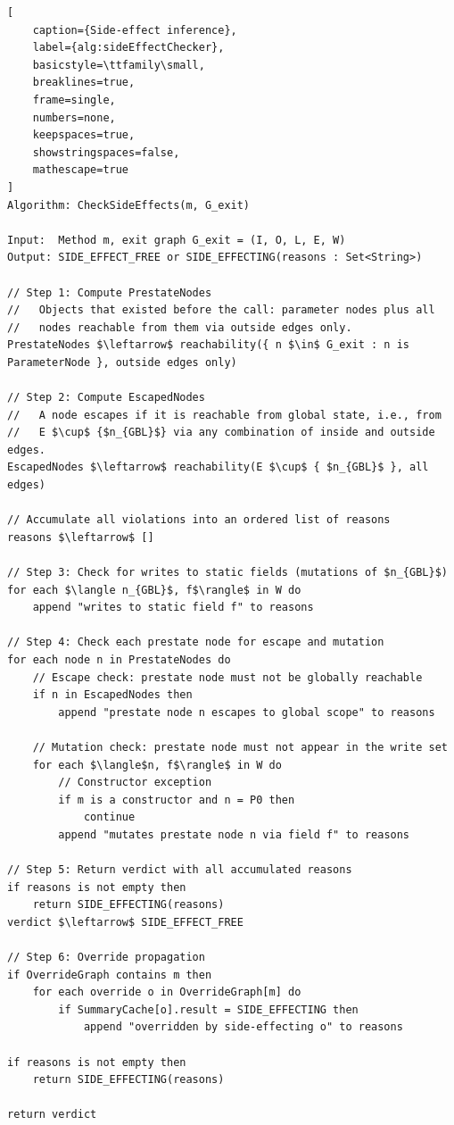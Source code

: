 \begin{lstlisting}[
    caption={Side-effect inference},
    label={alg:sideEffectChecker},
    basicstyle=\ttfamily\small,
    breaklines=true,
    frame=single,
    numbers=none,
    keepspaces=true,
    showstringspaces=false,
    mathescape=true
]
Algorithm: CheckSideEffects(m, G_exit)

Input:  Method m, exit graph G_exit = (I, O, L, E, W)
Output: SIDE_EFFECT_FREE or SIDE_EFFECTING(reasons : Set<String>)

// Step 1: Compute PrestateNodes
//   Objects that existed before the call: parameter nodes plus all
//   nodes reachable from them via outside edges only.
PrestateNodes $\leftarrow$ reachability({ n $\in$ G_exit : n is ParameterNode }, outside edges only)

// Step 2: Compute EscapedNodes
//   A node escapes if it is reachable from global state, i.e., from
//   E $\cup$ {$n_{GBL}$} via any combination of inside and outside edges.
EscapedNodes $\leftarrow$ reachability(E $\cup$ { $n_{GBL}$ }, all edges)

// Accumulate all violations into an ordered list of reasons
reasons $\leftarrow$ []

// Step 3: Check for writes to static fields (mutations of $n_{GBL}$)
for each $\langle n_{GBL}$, f$\rangle$ in W do
    append "writes to static field f" to reasons

// Step 4: Check each prestate node for escape and mutation
for each node n in PrestateNodes do
    // Escape check: prestate node must not be globally reachable
    if n in EscapedNodes then
        append "prestate node n escapes to global scope" to reasons

    // Mutation check: prestate node must not appear in the write set
    for each $\langle$n, f$\rangle$ in W do
        // Constructor exception
        if m is a constructor and n = P0 then
            continue
        append "mutates prestate node n via field f" to reasons

// Step 5: Return verdict with all accumulated reasons
if reasons is not empty then
    return SIDE_EFFECTING(reasons)
verdict $\leftarrow$ SIDE_EFFECT_FREE

// Step 6: Override propagation
if OverrideGraph contains m then
    for each override o in OverrideGraph[m] do
        if SummaryCache[o].result = SIDE_EFFECTING then
            append "overridden by side-effecting o" to reasons

if reasons is not empty then
    return SIDE_EFFECTING(reasons)

return verdict
\end{lstlisting}
